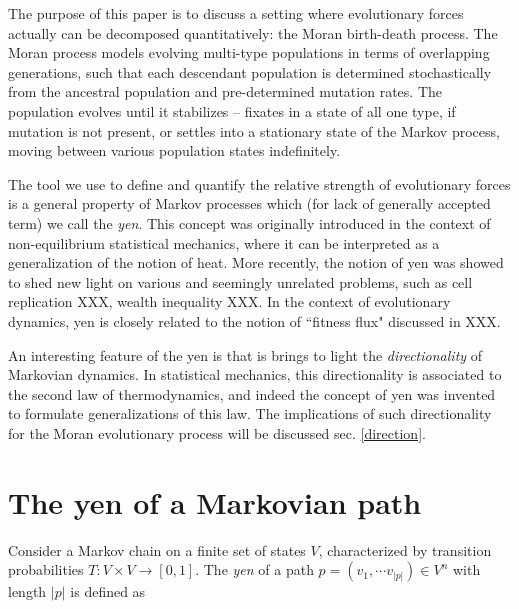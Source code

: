 \documentclass[aps,prd,11pt,notitlepage,nofootinbib,superscriptaddress,showkeys,letterpaper]{revtex4-1}
\begin{document}
The purpose of this paper is to discuss a setting where evolutionary forces actually can be decomposed quantitatively: the Moran birth-death process. The Moran process models evolving multi-type populations in terms of overlapping generations, such that each descendant population is determined stochastically from the ancestral population and pre-determined mutation rates. The population evolves until it stabilizes -- fixates in a state of all one type, if mutation is not present, or settles into a stationary state of the Markov process, moving between various population states indefinitely. \cite{}

The tool we use to define and quantify the relative strength of evolutionary forces is a general property of Markov processes which (for lack of generally accepted term) we call the \textit{yen}. This concept was originally introduced in the context of non-equilibrium statistical mechanics, where it can be interpreted as a generalization of the notion of heat. More recently, the notion of yen was showed to shed new light on various and seemingly unrelated problems, such as cell replication XXX,  wealth inequality XXX. In the context of evolutionary dynamics, yen is closely related to the notion of ``fitness flux" discussed in XXX.

An interesting feature of the yen is that is brings to light the \textit{directionality} of Markovian dynamics. In statistical mechanics, this directionality is associated to the second law of thermodynamics, and indeed the concept of yen was invented to formulate generalizations of this law. The implications of such directionality for the Moran evolutionary process will be discussed sec. \ref{direction}.

\section{The yen of a Markovian path}

Consider a Markov chain on a finite set of states $V$, characterized by transition probabilities $T:V\times V\to [0,1]$. The \textit{yen} of a path $p=(v_1,\cdots v_{\vert p \vert})\in V^n$ with length $\vert p \vert$ is defined as 
\end{document}
